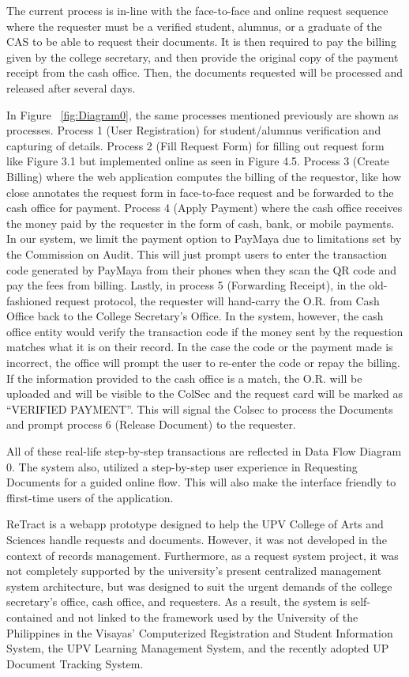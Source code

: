 The current process is in-line with the face-to-face and online request sequence where the requester must be a verified student, alumnus, or a graduate of the CAS to be able to request their documents. It is then required to pay the billing given by the college secretary, and then provide the original copy of the payment receipt from the cash office. Then, the documents requested will be processed and released after several days. 

In Figure ~\ref{fig:Diagram0}, the same processes mentioned previously are shown as processes. Process 1 (User Registration) for student/alumnus verification and capturing of details. Process 2 (Fill Request Form) for filling out request form like Figure 3.1 but implemented online as seen in Figure 4.5. Process 3 (Create Billing) where the web application computes the billing of the requestor, like how close annotates the request form in face-to-face request and be forwarded to the cash office for payment. Process 4 (Apply Payment) where the cash office receives the money paid by the requester in the form of cash, bank, or mobile payments. In our system, we limit the payment option to PayMaya due to limitations set by the Commission on Audit. This will just prompt users to enter the transaction code generated by PayMaya from their phones when they scan the QR code and pay the fees from billing. Lastly, in process 5 (Forwarding Receipt), in the old-fashioned request protocol, the requester will hand-carry the O.R. from Cash Office back to the College Secretary’s Office. In the system, however, the cash office entity would verify the transaction code if the money sent by the requestion matches what it is on their record. In the case the code or the payment made is incorrect, the office will prompt the user to re-enter the code or repay the billing. If the information provided to the cash office is a match, the O.R. will be uploaded and will be visible to the ColSec and the request card will be marked as “VERIFIED PAYMENT”. This will signal the Colsec to process the Documents and prompt process 6 (Release Document) to the requester. 

All of these real-life step-by-step transactions are reflected in Data Flow Diagram 0. The system also, utilized a step-by-step user experience in Requesting Documents for a guided online flow. This will also make the interface friendly to ffirst-time users of the application. 

ReTract is a webapp prototype designed to help the UPV College of Arts and Sciences handle requests and documents. However, it was not developed in the context of records management. Furthermore, as a request system project, it was not completely supported by the university's present centralized management system architecture, but was designed to suit the urgent demands of the college secretary's office, cash office, and requesters. As a result, the system is self-contained and not linked to the framework used by the University of the Philippines in the Visayas' Computerized Registration and Student Information System, the UPV Learning Management System, and the recently adopted UP Document Tracking System.

